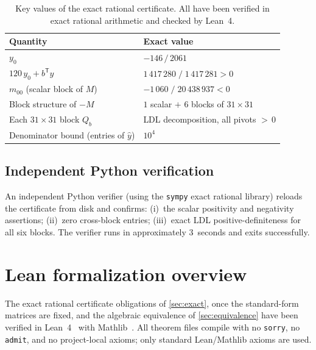 \begin{table}[ht]
\centering
\caption{Key values of the exact rational certificate.  All have been
  verified in exact rational arithmetic and checked by Lean~4.}
\label{tab:cert}
\renewcommand{\arraystretch}{1.25}
\begin{tabular}{@{}ll@{}}
\toprule
\textbf{Quantity} & \textbf{Exact value} \\
\midrule
$y_0$ & $-146\,/\,2061$ \\[2pt]
$120\,y_0 + b^{\mathsf{T}} y$
  & $1\,417\,280\;/\;1\,417\,281 > 0$ \\[2pt]
$m_{00}$ (scalar block of $M$)
  & $-1\,060\;/\;20\,438\,937 < 0$ \\[2pt]
Block structure of $-M$
  & $1$ scalar $+$ $6$ blocks of $31{\times}31$ \\[2pt]
Each $31{\times}31$ block $Q_b$
  & LDL decomposition, all pivots ${>}\,0$ \\[2pt]
Denominator bound (entries of $\hat{y}$)
  & $10^4$ \\
\bottomrule
\end{tabular}
\end{table}

\subsection{Independent Python verification}

An independent Python verifier (using the \texttt{sympy} exact
rational library) reloads the certificate from disk and confirms:
(i)~the scalar positivity and negativity assertions;
(ii)~zero cross-block entries;
(iii)~exact LDL positive-definiteness for all six blocks.
The verifier runs in approximately 3~seconds and exits successfully.

\section{Lean formalization overview}\label{sec:verification}

The exact rational certificate obligations of \cref{sec:exact}, once
the standard-form matrices are fixed, and the algebraic equivalence of
\cref{sec:equivalence} have been verified in Lean~4~\cite{moura2021lean4}
with Mathlib~\cite{mathlib4}.  All theorem files compile with no
\texttt{sorry}, no \texttt{admit}, and no project-local axioms; only
standard Lean/Mathlib axioms are used.

